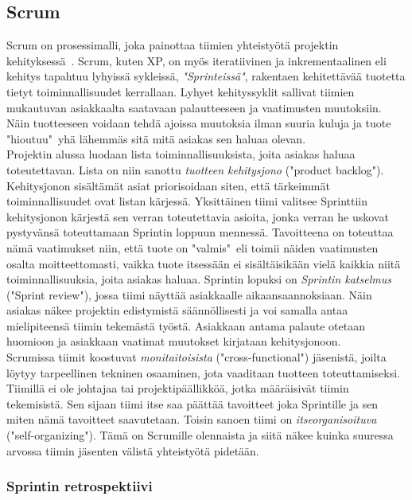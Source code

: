 \documentclass[finnish]{../tktltiki2}
\theoremstyle{definition}
\theoremstyle{remark}
\begin{document}
\subsection{Scrum}

Scrum on prosessimalli, joka painottaa tiimien yhteistyötä projektin kehityksessä~\cite{ScrumORG}. Scrum, kuten XP, on myös iteratiivinen ja inkrementaalinen
eli kehitys tapahtuu lyhyissä sykleissä, \emph{"Sprinteissä"}, rakentaen kehitettävää tuotetta tietyt toiminnallisuudet kerrallaan. Lyhyet kehityssyklit sallivat tiimien mukautuvan asiakkaalta saatavaan palautteeseen ja vaatimusten muutoksiin. Näin tuotteeseen voidaan tehdä ajoissa
muutoksia ilman suuria kuluja ja tuote "hioutuu"~yhä lähemmäs sitä mitä asiakas sen haluaa olevan.\\

Projektin alussa luodaan lista toiminnallisuuksista,
joita asiakas haluaa toteutettavan. Lista on niin sanottu \emph{tuotteen kehitysjono} ("product backlog"). Kehitysjonon sisältämät asiat priorisoidaan siten, että tärkeimmät toiminnallisuudet ovat listan kärjessä. Yksittäinen tiimi valitsee Sprinttiin kehitysjonon kärjestä sen verran
toteutettavia asioita, jonka verran he uskovat pystyvänsä toteuttamaan Sprintin loppuun mennessä. Tavoitteena on toteuttaa nämä vaatimukset niin,
että tuote on "valmis"~eli toimii näiden vaatimusten osalta moitteettomasti, vaikka tuote itsessään ei sisältäisikään vielä kaikkia niitä
toiminnallisuuksia, joita asiakas haluaa. Sprintin lopuksi on \emph{Sprintin katselmus} ("Sprint review"), jossa tiimi näyttää asiakkaalle
aikaansaannoksiaan. Näin asiakas näkee projektin edistymistä säännöllisesti ja voi samalla antaa mielipiteensä tiimin tekemästä työstä. Asiakkaan
antama palaute otetaan huomioon ja asiakkaan vaatimat muutokset kirjataan kehitysjonoon.\\

Scrumissa tiimit koostuvat \emph{monitaitoisista} ("cross-functional") jäsenistä, joilta löytyy tarpeellinen tekninen osaaminen, jota vaaditaan
tuotteen toteuttamiseksi. Tiimillä ei ole johtajaa tai projektipäällikköä, jotka määräisivät tiimin tekemisistä. Sen sijaan tiimi itse
saa päättää tavoitteet joka Sprintille ja sen miten nämä tavoitteet saavutetaan. Toisin sanoen tiimi on \emph{itseorganisoituva}
("self-organizing"). Tämä on Scrumille olennaista ja siitä näkee kuinka suuressa arvossa tiimin jäsenten välistä yhteistyötä pidetään.~\cite{ScrumHandBook}

\subsubsection{Sprintin retrospektiivi}
\end{document}
